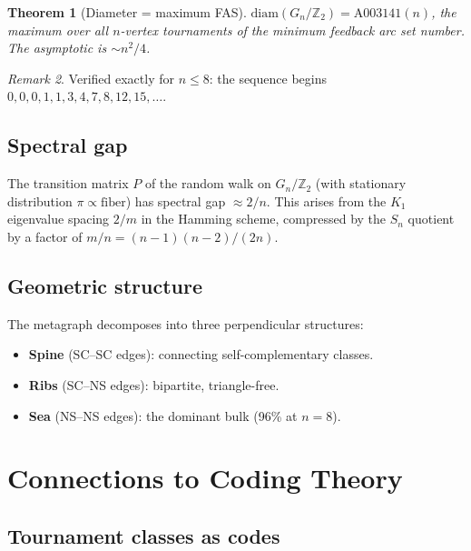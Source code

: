 \documentclass[11pt,a4paper]{article}
\newtheorem{theorem}{Theorem}[section]
\theoremstyle{definition}
\theoremstyle{remark}
\newtheorem{remark}[theorem]{Remark}
\begin{document}
\begin{theorem}[Diameter = maximum FAS]
\label{thm:diameter}
$\mathrm{diam}(G_n / \mathbb{Z}_2) = \text{A003141}(n)$, the maximum over all $n$-vertex tournaments of the minimum feedback arc set number. The asymptotic is $\sim n^2/4$.
\end{theorem}

\begin{remark}
Verified exactly for $n \leq 8$: the sequence begins $0, 0, 0, 1, 1, 3, 4, 7, 8, 12, 15, \ldots$.
\end{remark}

\subsection{Spectral gap}

The transition matrix $P$ of the random walk on $G_n / \mathbb{Z}_2$ (with stationary distribution $\pi \propto \mathrm{fiber}$) has spectral gap $\approx 2/n$. This arises from the $K_1$ eigenvalue spacing $2/m$ in the Hamming scheme, compressed by the $S_n$ quotient by a factor of $m/n = (n-1)(n-2)/(2n)$.

\subsection{Geometric structure}

The metagraph decomposes into three perpendicular structures:
\begin{itemize}
\item \textbf{Spine} (SC--SC edges): connecting self-complementary classes.
\item \textbf{Ribs} (SC--NS edges): bipartite, triangle-free.
\item \textbf{Sea} (NS--NS edges): the dominant bulk (96\% at $n = 8$).
\end{itemize}

\section{Connections to Coding Theory}
\label{sec:codes}

\subsection{Tournament classes as codes}
\end{document}
